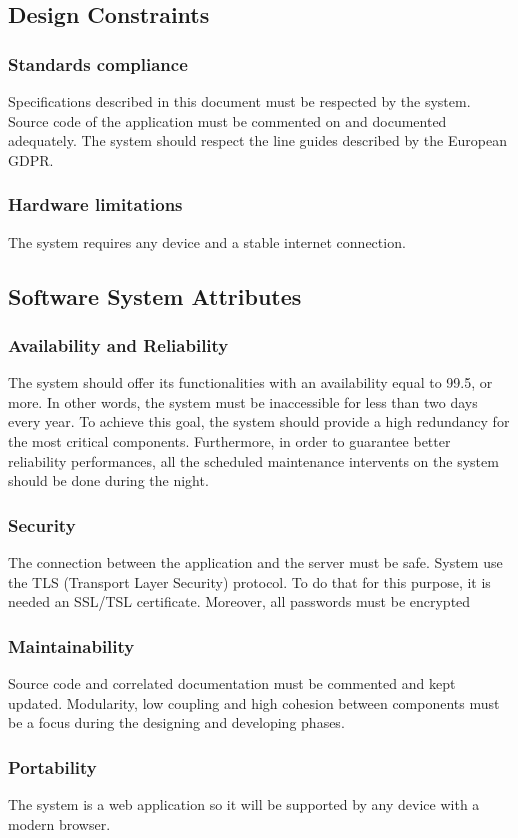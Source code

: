 \subsection{Design Constraints}


\subsubsection{Standards compliance}
Specifications described in this document must be respected by the system.
Source code of the application must be commented on and documented adequately.
The system should respect the line guides described by the European GDPR.

\subsubsection{Hardware limitations}
The system requires any device and a stable internet connection.

\subsection{Software System Attributes}

\subsubsection{Availability and Reliability}
The system should offer its functionalities with an availability
equal to 99.5, or more. In other words, the system must be inaccessible 
for less than two days every year. To achieve this goal, the system should
provide a high redundancy for the most critical components.
Furthermore, in order to guarantee better reliability performances, all 
the scheduled maintenance intervents on the system should be done during
the night.

\subsubsection{Security}
The connection between the application and the server must be safe.
System use the TLS (Transport Layer Security) protocol.
To do that for this purpose, it is needed an SSL/TSL certificate. 
Moreover, all passwords must be encrypted

\subsubsection{Maintainability}
Source code and correlated documentation must be commented and kept updated.
Modularity, low coupling and high cohesion between components must be a focus during the 
designing and developing phases.

\subsubsection{Portability}
The system is a web application so it will be supported by any device with
a modern browser.